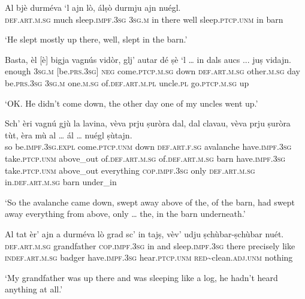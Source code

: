 \begin{linenumbers}
\gll  Al bjè durméva `l ajn lò, álṣò durmju ajn nuégl.\\
 \textsc{def.art.m.sg} much sleep.\textsc{impf.3sg} \textsc{3sg.m} in there well sleep.\textsc{ptcp.unm} in barn\\
\end{linenumbers}
\medskip
\glt `He slept mostly up there, well, slept in the barn.'
\medskip

\begin{linenumbers}
\gll  Basta, èl [è] bigja vagnús vidòr, glj’ autar dé ṣè `l … in dals aucs ... juṣ vidajn.  \\
enough \textsc{3sg.m} [be.\textsc{prs.3sg}] \textsc{neg} come.\textsc{ptcp.m.sg} down \textsc{def.art.m.sg} other.\textsc{m.sg} day be.\textsc{prs.3sg} \textsc{3sg.m} {} one.\textsc{m.sg} of.\textsc{def.art.m.pl} uncle.\textsc{pl} {} go.\textsc{ptcp.m.sg} up\\
\end{linenumbers}
\medskip
\glt `OK. He didn’t come down, the other day one of my uncles went up.'
\medskip

\begin{linenumbers}
\gll Sch’ èri vagnú gjù la lavina, vèva prju ṣuròra dal, dal clavau, vèva prju ṣuròra tùt, èra mù al … ál … nuégl ṣùtajn.\\
so be.\textsc{impf.3sg}.\textsc{expl} come.\textsc{ptcp.unm} down \textsc{def.art.f.sg} avalanche have.\textsc{impf.3sg} take.\textsc{ptcp.unm} above\_out of.\textsc{def.art.m.sg} of.\textsc{def.art.m.sg} barn have.\textsc{impf.3sg} take.\textsc{ptcp.unm} above\_out everything \textsc{cop.impf.3sg} only \textsc{def.art.m.sg} {} in.\textsc{def.art.m.sg} {} barn under\_in \\
\end{linenumbers}
\medskip
\glt `So the avalanche came down, swept away above of the, of the barn, had swept away everything from above, only … the, in the barn underneath.'
\medskip

\begin{linenumbers}
\gll  Al tat èr’ ajn a durméva lò grad sc’ in tajṣ, vèv’ udju ṣchùbar-ṣchùbar nuét.  \\
 \textsc{def.art.m.sg} grandfather \textsc{cop.impf.3sg} in and sleep.\textsc{impf.3sg} there precisely like \textsc{indef.art.m.sg} badger have.\textsc{impf.3sg} hear.\textsc{ptcp.unm} \textsc{red}\textasciitilde{clean}.\textsc{adj.unm} nothing\\
\end{linenumbers}
\medskip
\glt `My grandfather was up there and was sleeping like a log, he hadn’t heard anything at all.'
\medskip

